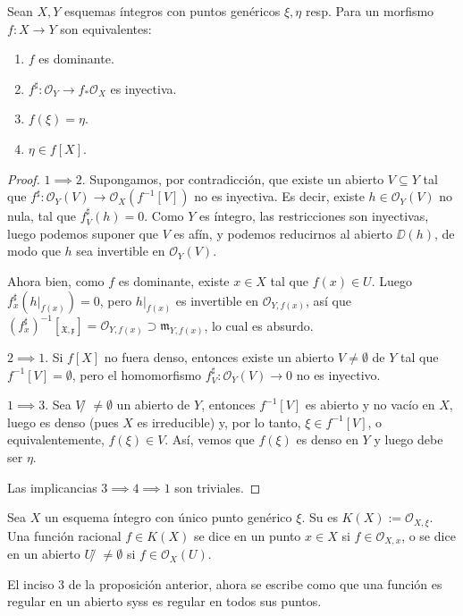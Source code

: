 \begin{thm}
	Sean $X, Y$ esquemas íntegros con puntos genéricos $\xi, \eta$ resp.
	Para un morfismo $f \colon X \to Y$ son equivalentes:
	\begin{enumerate}
		\item $f$ es dominante.
		\item $f^\sharp \colon \mathscr{O}_Y \to f_*\mathscr{O}_X$ es inyectiva.
		\item $f(\xi) = \eta$.
		\item $\eta \in f[X]$.
	\end{enumerate}
\end{thm}
\begin{proof}
	$1 \implies 2$. Supongamos, por contradicción, que existe un abierto $V \subseteq Y$ tal que
	$f^\sharp \colon \mathscr{O}_Y (V ) \to \mathscr{O}_X (f^{-1} [V ])$ no es inyectiva.
	Es decir, existe $h \in \mathscr{O}_Y (V )$ no nula, tal que $f_V^\sharp (h) = 0$.
	Como $Y$ es íntegro, las restricciones son inyectivas, luego podemos suponer que $V$ es afín, y podemos reducirnos al abierto $\DD(h)$,
	de modo que $h$ sea invertible en $\mathscr{O}_Y (V )$.

	Ahora bien, como $f$ es dominante, existe $x \in X$ tal que $f (x) \in U $.
	Luego $f_x^\sharp (h|_{f(x)} ) = 0$, pero $h|_{f (x)}$ es invertible en $\mathscr{O}_{Y,f(x)}$,
	así que $(f_x^\sharp)^{-1}[\mathfrak{_{X, x}}] = \mathscr{O}_{Y,f(x)} \supset \mathfrak{m}_{Y, f(x)}$, lo cual es absurdo.

	$2 \implies 1$. Si $f[X]$ no fuera denso, entonces existe un abierto $V \ne \emptyset$ de $Y$
	tal que $f^{-1}[V] = \emptyset$, pero el homomorfismo $f_V^\sharp \colon \mathscr{O}_Y (V ) \to 0$ no es inyectivo.

	$1 \implies 3$. Sea $V ̸\ne \emptyset$ un abierto de $Y$, entonces $f^{-1} [V ]$ es abierto y no vacío en $X$, luego es denso (pues $X$ es irreducible) y,
	por lo tanto, $\xi \in f^{-1} [V ]$, o equivalentemente, $f (\xi) \in V$.
	Así, vemos que $f(\xi)$ es denso en $Y$ y luego debe ser $\eta$.

	Las implicancias $3 \implies 4 \implies 1$ son triviales.
\end{proof}
\begin{mydef}
	Sea $X$ un esquema íntegro con único punto genérico $\xi$.
	Su  es $K(X) := \mathscr{O}_{X,\xi}$.
	Una función racional $f \in K(X)$ se dice  en un punto $x \in X$ si $f \in \mathscr{O}_{X,x}$,
	o se dice  en un abierto $U ̸\ne \emptyset$ si $f \in \mathscr{O}_X(U)$.
\end{mydef}
El inciso 3 de la proposición anterior, ahora se escribe como que una función es regular en un abierto syss es regular en todos sus puntos.


